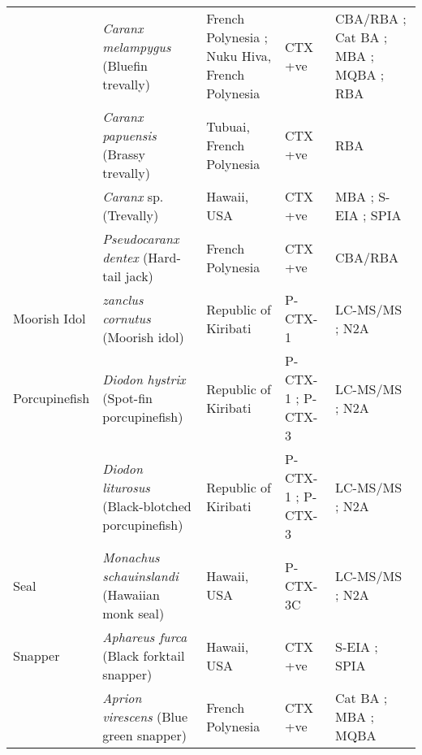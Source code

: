 \documentclass[12pt]{article}
\begin{document}
\begin{longtable}{ | p{2cm} | p{3cm} | p{4.5cm} | p{2cm} | p{3cm} | }
	& \emph{Caranx melampygus} (Bluefin trevally) & French Polynesia \cite{bagnis1987use,chinain2014mail}; Nuku Hiva, French Polynesia \cite{darius2007ciguatera} & CTX +ve \cite{bagnis1987use,darius2007ciguatera,chinain2014mail} & CBA/RBA \cite{chinain2014mail}; Cat BA \cite{bagnis1987use}; MBA \cite{bagnis1987use}; MQBA \cite{bagnis1987use}; RBA \cite{darius2007ciguatera} \\
	& \emph{Caranx papuensis} (Brassy trevally) & Tubuai, French Polynesia \cite{darius2007ciguatera} & CTX +ve \cite{darius2007ciguatera} & RBA \cite{darius2007ciguatera} \\
	& \emph{Caranx} sp. (Trevally) & Hawaii, USA \cite{hokama1993evaluation,hokama1990simplified} & CTX +ve \cite{hokama1990simplified,hokama1993evaluation} & MBA \cite{hokama1993evaluation}; S-EIA \cite{hokama1993evaluation,hokama1990simplified}; SPIA \cite{hokama1990simplified,hokama1993evaluation} \\
	& \emph{Pseudocaranx dentex} (Hard-tail jack) & French Polynesia \cite{chinain2014mail} & CTX +ve \cite{chinain2014mail} & CBA/RBA \cite{chinain2014mail} \\
	\hline
	Moorish Idol & \emph{zanclus cornutus} (Moorish idol) & Republic of Kiribati \cite{mak2013pacific} & P-CTX-1 \cite{mak2013pacific} & LC-MS/MS \cite{mak2013pacific}; N2A \cite{mak2013pacific} \\
	\hline
Porcupinefish & \emph{Diodon hystrix} (Spot-fin porcupinefish) & Republic of Kiribati \cite{mak2013pacific} & P-CTX-1 \cite{mak2013pacific}; P-CTX-3 \cite{mak2013pacific} & LC-MS/MS \cite{mak2013pacific}; N2A \cite{mak2013pacific} \\
& \emph{Diodon liturosus} (Black-blotched porcupinefish) & Republic of Kiribati \cite{mak2013pacific} & P-CTX-1 \cite{mak2013pacific}; P-CTX-3 \cite{mak2013pacific} & LC-MS/MS \cite{mak2013pacific}; N2A \cite{mak2013pacific} \\
\hline
	Seal & \emph{Monachus schauinslandi} (Hawaiian monk seal) & Hawaii, USA \cite{bottein2011identification} & P-CTX-3C \cite{bottein2011identification} & LC-MS/MS \cite{bottein2011identification}; N2A \cite{bottein2011identification} \\
	\hline
	Snapper & \emph{Aphareus furca} (Black forktail snapper) & Hawaii, USA \cite{hokama1990simplified} & CTX +ve \cite{hokama1990simplified} & S-EIA \cite{hokama1990simplified}; SPIA \cite{hokama1990simplified} \\
	& \emph{Aprion virescens} (Blue green snapper) & French Polynesia \cite{bagnis1987use} & CTX +ve \cite{bagnis1987use} & Cat BA \cite{bagnis1987use}; MBA \cite{bagnis1987use}; MQBA \cite{bagnis1987use} \\

\end{longtable}
\end{document}
